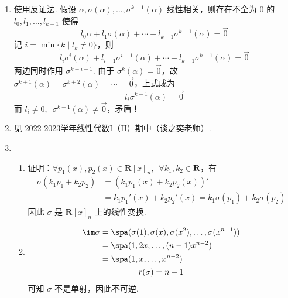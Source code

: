 \begin{enumerate}
    \item 使用反证法. 假设 $ \alpha, \sigma(\alpha), \ldots, \sigma^{k - 1}(\alpha) $ 线性相关，则存在不全为 0 的 $ l_0, l_1, \ldots, l_{k - 1} $ 使得
          \[ l_0 \alpha + l_1 \sigma(\alpha) + \cdots + l_{k - 1} \sigma^{k - 1}(\alpha) = \vec{0} \]
          记 $ i = \min\{k \mid l_k \neq 0\} $，则
          \[ l_i \sigma^{i}(\alpha) + l_{i + 1} \sigma^{i + 1}(\alpha) + \cdots + l_{k - 1} \sigma^{k - 1}(\alpha) = \vec{0} \]
          两边同时作用 $ \sigma^{k - i - 1} $. 由于 $ \sigma^{k}(\alpha) = \vec{0} $，故 $ \sigma^{k + 1}(\alpha) = \sigma^{k + 2}(\alpha) = \cdots = \vec{0} $，上式成为
          \[ l_i \sigma^{k - 1}(\alpha) = \vec{0} \]
          而 $ l_i \neq 0,\enspace \sigma^{k - 1}(\alpha) \neq \vec{0} $，矛盾！

    \item 见 \hyperref[sec:2022-2023-1midtzy]{2022-2023学年线性代数I（H）期中（谈之奕老师）}.

    \item \begin{enumerate}
        \item 证明：$ \forall p_1(x), p_2(x) \in \mathbf{R}[x]_n,\enspace \forall k_1, k_2 \in \mathbf{R} $，有
              \begin{align*}
                  \sigma(k_1 p_1 + k_2 p_2) & = (k_1 p_1(x) + k_2 p_2(x))'                                    \\
                                            & = k_1 p_1'(x) + k_2 p_2'(x) = k_1 \sigma(p_1) + k_2 \sigma(p_2)
              \end{align*}
              因此 $ \sigma $ 是 $ \mathbf{R}[x]_n $ 上的线性变换.

        \item \begin{gather*}
                  \begin{aligned}
                      \im \sigma & = \spa(\sigma(1), \sigma(x), \sigma(x^2), \ldots, \sigma(x^{n - 1})) \\
                                 & = \spa(1, 2x, \ldots, (n - 1) x^{n - 2})                             \\
                                 & = \spa(1, x, \ldots, x^{n - 2})
                  \end{aligned} \\
                  r(\sigma) = n - 1
              \end{gather*}
              可知 $ \sigma $ 不是单射，因此不可逆.


\end{enumerate}
\end{enumerate}
